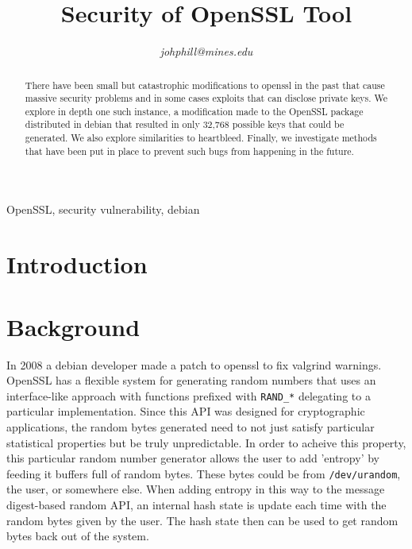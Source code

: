 \documentclass[conference]{IEEEtran}
\begin{document}
\title{Security of OpenSSL Tool}

\author{
\textit{johphill@mines.edu}\\
\and
{}
\and
{}
\and
{}
\and
{}
\and
{}
}

\maketitle

\begin{abstract}
There have been small but catastrophic modifications to openssl in the
past\cite{1}\cite{2}\cite{5} that cause massive security problems and
in some cases exploits that can disclose private keys. We explore in
depth one such instance, a modification made to the OpenSSL package
distributed in debian that resulted in only 32,768 possible keys that
could be generated. We also explore similarities to
heartbleed. Finally, we investigate methods that have been put in
place to prevent such bugs from happening in the future.
\end{abstract}

\begin{IEEEkeywords}
OpenSSL, security vulnerability, debian
\end{IEEEkeywords}

\section{Introduction}
\section{Background}
In 2008 a debian developer made a patch to openssl to fix valgrind
warnings\cite{2}\cite{3}. OpenSSL has a flexible system for generating
random numbers that uses an interface-like approach with functions
prefixed with \verb|RAND_*| delegating to a particular
implementation. Since this API was designed for cryptographic
applications, the random bytes generated need to not just satisfy
particular statistical properties but be truly unpredictable. In order
to acheive this property, this particular random number generator
allows the user to add 'entropy' by feeding it buffers full of random
bytes. These bytes could be from \verb|/dev/urandom|, the user, or
somewhere else. When adding entropy in this way to the message
digest-based random API, an internal hash state is update each time
with the random bytes given by the user. The hash state then can be
used to get random bytes back out of the system. 
\end{document}
